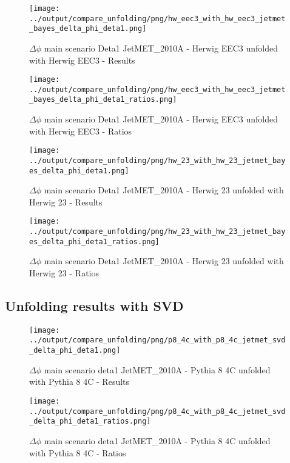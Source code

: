 \documentclass[11pt]{book}
\begin{document}
\begin{figure}[ht]
\centering
\texttt{[image: ../output/compare\_unfolding/png/hw\_eec3\_with\_hw\_eec3\_jetmet\_bayes\_delta\_phi\_deta1.png]}
\caption{$\Delta\phi$ main scenario Deta1 JetMET\_2010A - Herwig EEC3 unfolded with Herwig EEC3 - Results}
\label{hw_eec3_hw_eec3_jetmet_bayes_delta_phi_deta1_a}
\end{figure}

\begin{figure}[ht]
\centering
\texttt{[image: ../output/compare\_unfolding/png/hw\_eec3\_with\_hw\_eec3\_jetmet\_bayes\_delta\_phi\_deta1\_ratios.png]}
\caption{$\Delta\phi$ main scenario Deta1 JetMET\_2010A - Herwig EEC3 unfolded with Herwig EEC3 - Ratios}
\label{hw_eec3_hw_eec3_jetmet_bayes_delta_phi_deta1_b}
\end{figure}

\begin{figure}[ht]
\centering
\texttt{[image: ../output/compare\_unfolding/png/hw\_23\_with\_hw\_23\_jetmet\_bayes\_delta\_phi\_deta1.png]}
\caption{$\Delta\phi$ main scenario Deta1 JetMET\_2010A - Herwig 23 unfolded with Herwig 23 - Results}
\label{hw_23_hw_23_jetmet_bayes_delta_phi_deta1_a}
\end{figure}

\begin{figure}[ht]
\centering
\texttt{[image: ../output/compare\_unfolding/png/hw\_23\_with\_hw\_23\_jetmet\_bayes\_delta\_phi\_deta1\_ratios.png]}
\caption{$\Delta\phi$ main scenario Deta1 JetMET\_2010A - Herwig 23 unfolded with Herwig 23 - Ratios}
\label{hw_23_hw_23_jetmet_bayes_delta_phi_deta1_b}
\end{figure}


\clearpage
\subsection{Unfolding results with SVD}

\begin{figure}[ht]
\centering
\texttt{[image: ../output/compare\_unfolding/png/p8\_4c\_with\_p8\_4c\_jetmet\_svd\_delta\_phi\_deta1.png]}
\caption{$\Delta\phi$ main scenario deta1 JetMET\_2010A - Pythia 8 4C unfolded with Pythia 8 4C - Results}
\label{p8_p8_jetmet_svd_delta_phi_deta1_a}
\end{figure}

\begin{figure}[ht]
\centering
\texttt{[image: ../output/compare\_unfolding/png/p8\_4c\_with\_p8\_4c\_jetmet\_svd\_delta\_phi\_deta1\_ratios.png]}
\caption{$\Delta\phi$ main scenario deta1 JetMET\_2010A - Pythia 8 4C unfolded with Pythia 8 4C - Ratios}
\label{p8_p8_jetmet_svd_delta_phi_deta1_b}
\end{figure}
\end{document}

